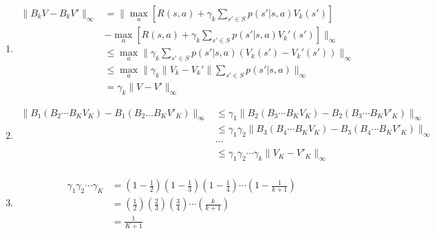 \documentclass[11pt]{article}
\begin{document}
\begin{tcolorbox}[breakable]


\begin{enumerate}
\item 
\begin{align}
\| B_k V - B_k V' \|_\infty 
& = \| \max_a[ R(s, a) + \gamma_k\sum_{s' \in S}p(s'|s,a)V_{k}(s')] \\ & - \max_a[ R(s, a) + \gamma_k\sum_{s' \in S}p(s'|s,a)V_{k}'(s')] \|_\infty \\
& \leq \max_a\| \gamma_k\sum_{s' \in S}p(s'|s,a)(V_{k}(s') - V_{k}'(s')) \|_\infty \\
& \leq \max_a\| \gamma_k\|V_{k} - V_{k}'\| \sum_{s' \in S}p(s'|s,a) \|_\infty \\
& = \gamma_k \|V - V' \|_\infty
\end{align}

\item 
\begin{align}
\| B_1(B_2 \cdots B_K V_K) -  B_1(B_2 \dots B_K V'_K) \|_\infty
& \leq \gamma_1 \| B_2 (B_3 \cdots B_K V_K) -   B_2 (B_3 \cdots B_K V'_K) \|_\infty \\
& \leq \gamma_1 \gamma_2 \| B_3 (B_4 \cdots B_K V_K) - B_3 (B_4 \cdots B_K V'_K) \|_\infty\\
& \cdots\\
& \leq \gamma_1 \gamma_2 \cdots \gamma_k \|V_K - V'_K \|_\infty\\
\end{align}

\item 
\begin{align}
\gamma_1 \gamma_2 \cdots \gamma_K 
& = (1 - \frac{1}{2})(1 - \frac{1}{3})(1 - \frac{1}{4}) \cdots (1 - \frac{1}{k+1})\\
& = (\frac{1}{2})(\frac{2}{3})(\frac{3}{4}) \cdots (\frac{k}{k+1}) \\
&= \frac{1}{K+1}
\end{align}
\end{enumerate}


\end{tcolorbox}


\newpage
\end{document}
